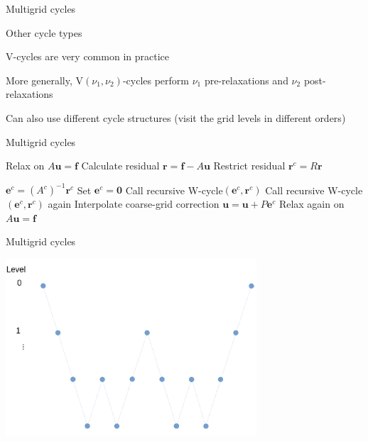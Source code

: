 \documentclass[18pt,xcolor=table]{beamer}
\begin{document}
\begin{frame}{Multigrid cycles}
\begin{block}{Other cycle types}
\bit
\item V-cycles are very common in practice
\item More generally, V$(\nu_1, \nu_2)$-cycles perform $\nu_1$ pre-relaxations and $\nu_2$ post-relaxations
\item Can also use different cycle structures (visit the grid levels in different orders)
\eit
\end{block}
\end{frame}

\begin{frame}{Multigrid cycles}
\begin{algorithm}[H]
\caption{Recursive W-cycle$(\mathbf{u},\mathbf{f})$}
\begin{algorithmic}
\State Relax on $A\mathbf{u} = \mathbf{f}$
\State Calculate residual $\mathbf{r} = \mathbf{f} - A\mathbf{u}$
\State Restrict residual $\mathbf{r}^c = R\mathbf{r}$

\State $\mathbf{e}^c = (A^c)^{-1}\mathbf{r}^c$
\Else
\State Set $\mathbf{e}^c = \mathbf{0}$
\State Call recursive W-cycle$(\mathbf{e}^c, \mathbf{r}^c)$
\State Call recursive W-cycle$(\mathbf{e}^c, \mathbf{r}^c)$ again
\EndIf
\State Interpolate coarse-grid correction $\mathbf{u} = \mathbf{u} + P\mathbf{e}^c$
\State Relax again on $A\mathbf{u} = \mathbf{f}$
\end{algorithmic}
\end{algorithm}
\end{frame}

\begin{frame}{Multigrid cycles}
\begin{center}
\includegraphics[width=0.7\textwidth]{../figures/Wcycle}
\end{center}
\end{frame}
\end{document}
